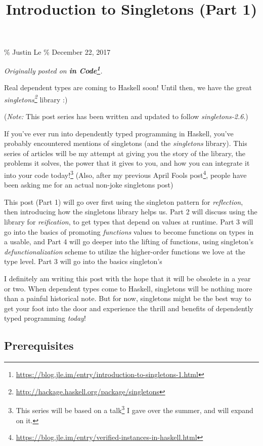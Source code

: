 \documentclass[]{article}
\title{Introduction to Singletons (Part 1)}
\renewcommand{\href}[2]{#2\footnote{\url{#1}}}
\begin{document}
\maketitle

\% Justin Le \% December 22, 2017

\emph{Originally posted on
\textbf{\href{https://blog.jle.im/entry/introduction-to-singletons-1.html}{in
Code}}.}

Real dependent types are coming to Haskell soon! Until then, we have the great
\emph{\href{http://hackage.haskell.org/package/singletons}{singletons}} library
:)

(\emph{Note:} This post series has been written and updated to follow
\emph{singletons-2.6}.)

If you've ever run into dependently typed programming in Haskell, you've
probably encountered mentions of singletons (and the \emph{singletons} library).
This series of articles will be my attempt at giving you the story of the
library, the problems it solves, the power that it gives to you, and how you can
integrate it into your code today!\footnote{This series will be based on
  \href{http://talks.jle.im/lambdaconf-2017/singletons/}{a talk} I gave over the
  summer, and will expand on it.} (Also, after
\href{https://blog.jle.im/entry/verified-instances-in-haskell.html}{my previous
April Fools post}, people have been asking me for an actual non-joke singletons
post)

This post (Part 1) will go over first using the singleton pattern for
\emph{reflection}, then introducing how the singletons library helps us. Part 2
will discuss using the library for \emph{reification}, to get types that depend
on values at runtime. Part 3 will go into the basics of promoting
\emph{functions} values to become functions on types in a usable, and Part 4
will go deeper into the lifting of functions, using singleton's
\emph{defunctionalization} scheme to utilize the higher-order functions we love
at the type level. Part 3 will go into the basics singleton's

I definitely am writing this post with the hope that it will be obsolete in a
year or two. When dependent types come to Haskell, singletons will be nothing
more than a painful historical note. But for now, singletons might be the best
way to get your foot into the door and experience the thrill and benefits of
dependently typed programming \emph{today}!

\subsection{Prerequisites}\label{prerequisites}
\end{document}
